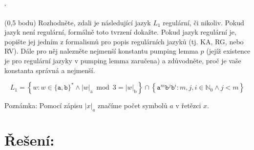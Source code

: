 \documentclass[10pt]{article}
\begin{document}
`

\noindent
(0,5 bodu) Rozhodněte, zdali je následující jazyk $L_1$ regulární, či nikoliv. Pokud jazyk není regulární, formálně toto tvrzení dokažte. Pokud jazyk regulární je, popište jej jedním z formalismů pro popis regulárních jazyků (tj. KA, RG, nebo RV). Dále pro něj nalezněte nejmenší  konstantu pumping lemma $p$ (jejíž existence je pro regulární jazyky v pumping lemma zaručena) a zdůvodněte, proč je vaše konstanta správná a nejmenší.

$$L_1=\left\{w: w \in\{\mathtt{a}, \mathtt{b}\}^{*} \wedge|w|_{\mathrm{a}} \bmod 3=|w|_{\mathrm{b}}\right\} \cap\left\{\mathtt{a}^{m} \mathtt{b}^{j} \mathtt{b}^{i}: m, j, i \in \mathbb{N}_{0} \wedge j<m\right\}$$

\noindent
Poznámka: Pomocí zápisu $|x|_a$ značíme počet symbolů $a$ v řetězci $x$.

\section*{Řešení:}
\end{document}
